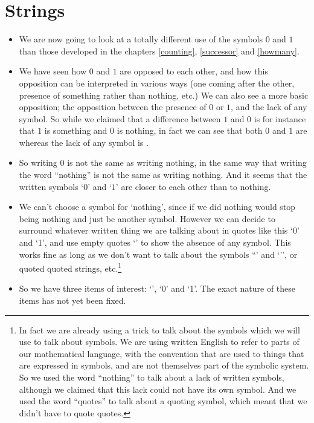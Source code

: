 \chapter{Strings}
\label{string}

\begin{itemize}
\item
We are now going to look at a totally different use of the symbols $0$ and $1$ than those developed in the chapters \ref{counting}, \ref{successor} and \ref{howmany}.
\item
We have seen how $0$ and $1$ are opposed to each other, and how this opposition can be interpreted in various ways (one coming after the other, presence of something rather than nothing, etc.) We can also see a more basic opposition; the opposition between the presence of  $0$ or $1$, and the lack of any symbol. So while we claimed that a difference between $1$ and $0$ is for instance that $1$ is something and $0$ is nothing, in fact we can see that both $0$ and $1$ are  whereas the lack of any symbol is .
\item
So writing $0$ is not the same as writing nothing, in the same way that writing the word ``nothing'' is not the same as writing nothing. And it seems that the written symbols `$0$' and `$1$' are closer to each other than to nothing.
\item
  We can't choose a symbol for `nothing', since if we did nothing would stop being nothing and just be another symbol. However we can decide to surround whatever written thing we are talking about in quotes like this `0' and `1', and use empty quotes `' to show the absence of any symbol. This works fine as long as we don't want to talk about the symbols ``' and `'', or quoted quoted strings, etc.\footnote{In fact we are already using a trick to talk about the symbols which we will use to talk about symbols. We are using written English to refer to parts of our mathematical language, with the convention that  are used to  things that are expressed in symbols, and are not themselves part of the symbolic system. So we used the word ``nothing'' to talk about a lack of written symbols, although we claimed that this lack could not have its own symbol. And we used the word ``quotes'' to talk about a quoting symbol, which meant that we didn't have to quote quotes.}
\item
So we have three items of interest: `', `0' and `1'. The exact nature of these items has not yet been fixed.

\end{itemize}

